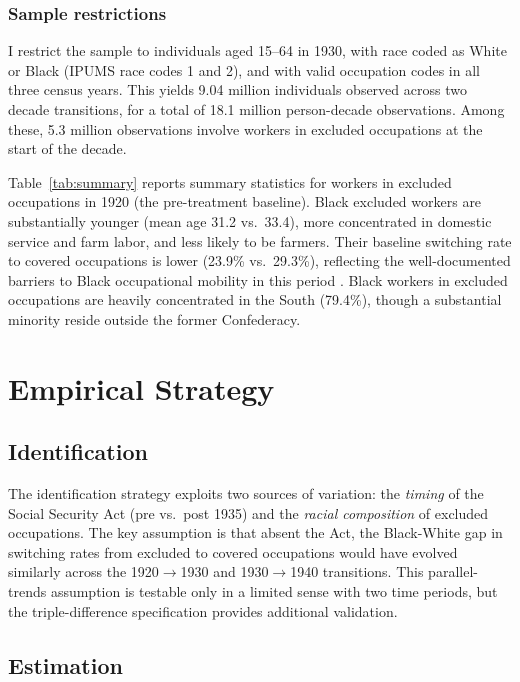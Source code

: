 \documentclass[12pt]{article}
\begin{document}
\subsubsection*{Sample restrictions} I restrict the sample to individuals aged 15--64 in 1930, with race coded as White or Black (IPUMS race codes 1 and 2), and with valid occupation codes in all three census years. This yields 9.04 million individuals observed across two decade transitions, for a total of 18.1 million person-decade observations. Among these, 5.3 million observations involve workers in excluded occupations at the start of the decade.



Table~\ref{tab:summary} reports summary statistics for workers in excluded occupations in 1920 (the pre-treatment baseline). Black excluded workers are substantially younger (mean age 31.2 vs.\ 33.4), more concentrated in domestic service and farm labor, and less likely to be farmers. Their baseline switching rate to covered occupations is lower (23.9\% vs.\ 29.3\%), reflecting the well-documented barriers to Black occupational mobility in this period \citep{sundstrom1994, margo1990}. Black workers in excluded occupations are heavily concentrated in the South (79.4\%), though a substantial minority reside outside the former Confederacy.


\section{Empirical Strategy}

\subsection{Identification}

The identification strategy exploits two sources of variation: the \textit{timing} of the Social Security Act (pre vs.\ post 1935) and the \textit{racial composition} of excluded occupations. The key assumption is that absent the Act, the Black-White gap in switching rates from excluded to covered occupations would have evolved similarly across the 1920$\to$1930 and 1930$\to$1940 transitions. This parallel-trends assumption is testable only in a limited sense with two time periods, but the triple-difference specification provides additional validation.

\subsection{Estimation}
\end{document}

